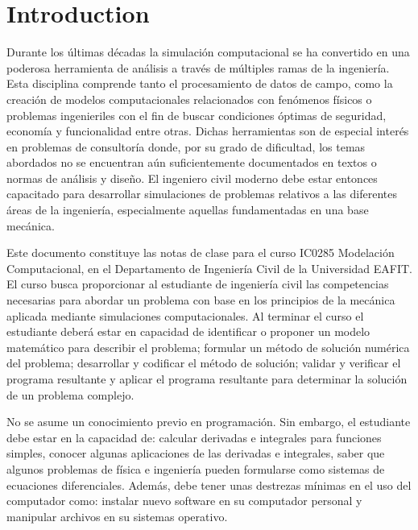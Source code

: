 \chapter*{Introduction}

Durante los últimas décadas la simulación computacional se ha convertido en una poderosa herramienta de análisis a través de múltiples ramas de la ingeniería. Esta disciplina comprende tanto el procesamiento de datos de campo, como la creación de modelos computacionales relacionados con fenómenos físicos o problemas ingenieriles con el fin de buscar condiciones óptimas de seguridad, economía y funcionalidad entre otras.  Dichas herramientas son de especial interés en problemas de consultoría donde, por su grado de dificultad, los temas abordados no se encuentran aún suficientemente documentados en textos o normas de análisis y diseño.  El ingeniero civil moderno debe estar entonces capacitado para desarrollar simulaciones de problemas relativos a las diferentes áreas de la ingeniería, especialmente aquellas fundamentadas en una base mecánica.

Este documento constituye las notas de clase para el curso IC0285 Modelación Computacional, en el Departamento de Ingeniería Civil de la Universidad EAFIT. 
El curso busca proporcionar al estudiante de ingeniería civil las competencias necesarias para abordar un problema con base en los principios de la mecánica aplicada mediante simulaciones computacionales. Al terminar el curso el estudiante deberá estar en capacidad de identificar o proponer un modelo matemático para describir el problema; formular un método de solución numérica del problema; desarrollar y codificar el método de solución; validar y verificar el programa resultante y aplicar el programa resultante para determinar la solución de un problema complejo.

No se asume un conocimiento previo en programación. Sin embargo, el estudiante debe estar en la capacidad de: calcular derivadas e integrales para funciones simples, conocer algunas aplicaciones de las derivadas e integrales, saber que algunos problemas de física e ingeniería pueden formularse como sistemas de ecuaciones diferenciales. Además, debe tener unas destrezas mínimas en el uso del computador como: instalar nuevo software en su computador personal y manipular archivos en su sistemas operativo.